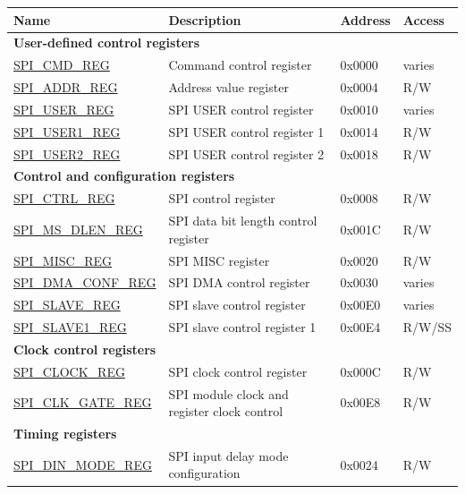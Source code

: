 \begin{longtable}{ | p{6cm} | p{7.2cm} | p{1.3cm} | p{1cm} | }
\hline\rowcolor{lightgray}
\textbf{Name} & \textbf{Description} &  \textbf{Address} & \textbf{Access} \\ \hline
\endhead
\multicolumn{4}{|l|}{\textbf{User-defined control registers}} \\ \hline
\hyperref[regdesc:SPICMDREG]{SPI\_CMD\_REG} & Command control register & 0x0000 & varies \\ \hline
\hyperref[regdesc:SPIADDRREG]{SPI\_ADDR\_REG} & Address value register & 0x0004 & R/W \\ \hline
\hyperref[regdesc:SPIUSERREG]{SPI\_USER\_REG} & SPI USER control register & 0x0010 & varies \\ \hline
\hyperref[regdesc:SPIUSER1REG]{SPI\_USER1\_REG} & SPI USER control register 1 & 0x0014 & R/W \\ \hline
\hyperref[regdesc:SPIUSER2REG]{SPI\_USER2\_REG} & SPI USER control register 2 & 0x0018 & R/W \\ \hline
\multicolumn{4}{|l|}{\textbf{Control and configuration registers}} \\ \hline
\hyperref[regdesc:SPICTRLREG]{SPI\_CTRL\_REG} & SPI control register & 0x0008 & R/W \\ \hline
\hyperref[regdesc:SPIMSDLENREG]{SPI\_MS\_DLEN\_REG} & SPI data bit length control register & 0x001C & R/W \\ \hline
\hyperref[regdesc:SPIMISCREG]{SPI\_MISC\_REG} & SPI MISC register & 0x0020 & R/W \\ \hline
\hyperref[regdesc:SPIDMACONFREG]{SPI\_DMA\_CONF\_REG} & SPI DMA control register & 0x0030 & varies \\ \hline
\hyperref[regdesc:SPISLAVEREG]{SPI\_SLAVE\_REG} & SPI slave control register & 0x00E0 & varies \\ \hline
\hyperref[regdesc:SPISLAVE1REG]{SPI\_SLAVE1\_REG} & SPI slave control register 1 & 0x00E4 & R/W/SS \\ \hline
\multicolumn{4}{|l|}{\textbf{Clock control registers}} \\ \hline
\hyperref[regdesc:SPICLOCKREG]{SPI\_CLOCK\_REG} & SPI clock control register & 0x000C & R/W \\ \hline
\hyperref[regdesc:SPICLKGATEREG]{SPI\_CLK\_GATE\_REG} & SPI module clock and register clock control & 0x00E8 & R/W \\ \hline
\multicolumn{4}{|l|}{\textbf{Timing registers}} \\ \hline
\hyperref[regdesc:SPIDINMODEREG]{SPI\_DIN\_MODE\_REG} & SPI input delay mode configuration & 0x0024 & R/W \\ \hline

\end{longtable}
